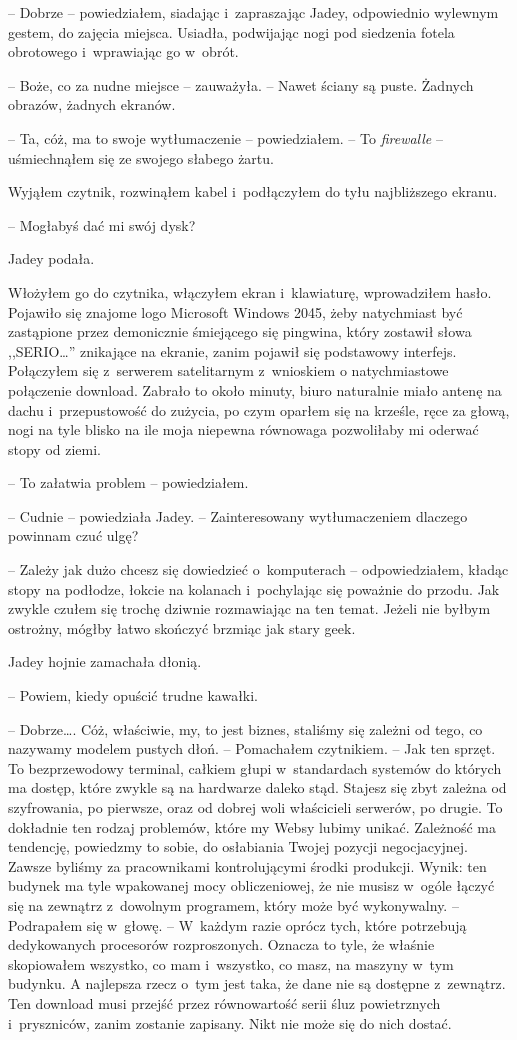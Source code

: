 \documentclass[oneside,polish,12pt,sfheadings]{mwbk}
\begin{document}
-- Dobrze -- powiedziałem, siadając i~zapraszając Jadey, odpowiednio
wylewnym gestem, do zajęcia miejsca. Usiadła, podwijając nogi pod
siedzenia fotela obrotowego i~wprawiając go w~obrót.

-- Boże, co za nudne miejsce -- zauważyła. -- Nawet ściany są puste.
Żadnych obrazów, żadnych ekranów.

-- Ta, cóż, ma to swoje wytłumaczenie -- powiedziałem. -- To
\emph{firewalle} -- uśmiechnąłem się ze swojego słabego żartu.

Wyjąłem czytnik, rozwinąłem kabel i~podłączyłem do tyłu najbliższego
ekranu. 

-- Mogłabyś dać mi swój dysk?

Jadey podała.

Włożyłem go do czytnika, włączyłem ekran i~klawiaturę, wprowadziłem
hasło. Pojawiło się znajome logo Microsoft Windows 2045, żeby
natychmiast być zastąpione przez demonicznie śmiejącego się pingwina,
który zostawił słowa ,,SERIO\ldots'' znikające na ekranie, zanim pojawił się
podstawowy interfejs. Połączyłem się z~serwerem satelitarnym z~wnioskiem
o natychmiastowe połączenie download. Zabrało to około minuty, biuro
naturalnie miało antenę na dachu i~przepustowość do zużycia, po czym
oparłem się na krześle, ręce za głową, nogi na tyle blisko na ile moja
niepewna równowaga pozwoliłaby mi oderwać stopy od ziemi.

-- To załatwia problem -- powiedziałem.

-- Cudnie -- powiedziała Jadey. -- Zainteresowany wytłumaczeniem dlaczego
powinnam czuć ulgę?

-- Zależy jak dużo chcesz się dowiedzieć o~komputerach -- odpowiedziałem,
kładąc stopy na podłodze, łokcie na kolanach i~pochylając się poważnie
do przodu. Jak zwykle czułem się trochę dziwnie rozmawiając na ten
temat. Jeżeli nie byłbym ostrożny, mógłby łatwo skończyć brzmiąc jak
stary geek.

Jadey hojnie zamachała dłonią. 

-- Powiem, kiedy opuścić trudne kawałki.

-- Dobrze\ldots. Cóż, właściwie, my, to jest biznes, staliśmy się zależni
od tego, co nazywamy modelem pustych dłoń. -- Pomachałem czytnikiem. --
Jak ten sprzęt. To bezprzewodowy terminal, całkiem głupi w~standardach
systemów do których ma dostęp, które zwykle są na hardwarze daleko stąd.
Stajesz się zbyt zależna od szyfrowania, po pierwsze, oraz od dobrej
woli właścicieli serwerów, po drugie. To dokładnie ten rodzaj problemów,
które my Websy lubimy unikać. Zależność ma tendencję, powiedzmy to
sobie, do osłabiania Twojej pozycji negocjacyjnej. Zawsze byliśmy za
pracownikami kontrolującymi środki produkcji. Wynik: ten budynek ma tyle
wpakowanej mocy obliczeniowej, że nie musisz w~ogóle łączyć się na
zewnątrz z~dowolnym programem, który może być wykonywalny. -- Podrapałem
się w~głowę. -- W~każdym razie oprócz tych, które potrzebują dedykowanych
procesorów rozproszonych. Oznacza to tyle, że właśnie skopiowałem
wszystko, co mam i~wszystko, co masz, na maszyny w~tym budynku. A
najlepsza rzecz o~tym jest taka, że dane nie są dostępne z~zewnątrz. Ten
download musi przejść przez równowartość serii śluz powietrznych i~pryszniców, zanim zostanie zapisany. Nikt nie może się do nich dostać.
\end{document}
